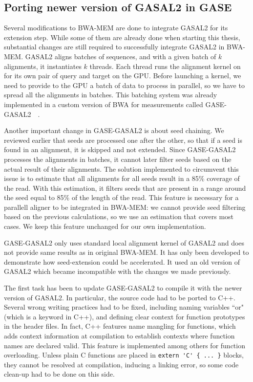 \subsection{Porting newer version of GASAL2 in GASE}

Several modifications to BWA-MEM are done to integrate GASAL2 for its extension step. While some of them are already done when starting this thesis, substantial changes are still required to successfully integrate GASAL2 in BWA-MEM. 
GASAL2 aligns batches of sequences, and with a given batch of $k$ alignments, it instantiates $k$ threads. Each thread runs the alignment kernel on for its own pair of query and target on the GPU. Before launching a kernel, we need to provide to the GPU a batch of data to process in parallel, so we have to spread all the alignments in batches. This batching system was already implemented in a custom version of BWA for measurements called GASE-GASAL2~\cite{Ahmed:gase-gasal2}~\cite{Ahmed:GASE}. 

Another important change in GASE-GASAL2 is about seed chaining. We reviewed earlier that seeds are processed one after the other, so that if a seed is found in an alignment, it is skipped and not extended. Since GASE-GASAL2 processes the alignments in batches, it cannot later filter seeds based on the actual result of their alignments. The solution implemented to circumvent this issue is to estimate that all alignments for all seeds result in a 85\% coverage of the read. With this estimation, it filters seeds that are present in a range around the seed equal to 85\% of the length of the read. This feature is necessary for a parallell aligner to be integrated in BWA-MEM: we cannot provide seed filtering based on the previous calculations, so we use an estimation that covers most cases. We keep this feature unchanged for our own implementation.

GASE-GASAL2 only uses standard local alignment kernel of GASAL2 and does not provide same results as in original BWA-MEM. It has only been developed to demonstrate how seed-extension could be accelerated. It used an old version of GASAL2 which became incompatible with the changes we made previously.

The first task has been to update GASE-GASAL2 to compile it with the newer version of GASAL2. In particular, the source code had to be ported to C++. Several wrong writing practices had to be fixed, including naming variables ``or" (which is a keyword in C++), and defining clear context for function prototypes in the header files. In fact, C++ features name mangling for functions, which adds context information at compilation to establish contexts where function names are declared valid. This feature is implemented among others for function overloading. Unless plain C functions are placed in \verb|extern 'C' { ... }| blocks, they cannot be resolved at compilation, inducing a linking error, so some code clean-up had to be done on this side.